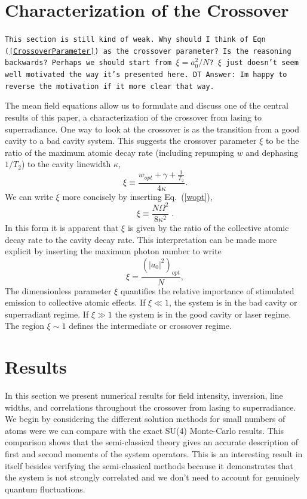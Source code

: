\documentclass[aps,
twocolumn,
showpacs,
superscriptaddress,groupedaddress]{revtex4}
\newcommand{\dmcomment}[1]{{\tt #1}}
\begin{document}
\section{Characterization of the Crossover}
\label{sec:CrossoverCharacterization}

\dmcomment{This section is still kind of weak.  Why should I think of
Eqn (\ref{CrossoverParameter}) as the crossover parameter?  Is the
reasoning backwards?  Perhaps we should start from $\xi=a_0^2/N$?  $\xi$
just doesn't seem well motivated the way it's presented here. DT Answer: Im happy to reverse the motivation if it more clear that way.}

The mean field equations allow us to formulate and discuss one of the
central results of this paper, a characterization of the crossover from
lasing to superradiance.  One way to look at the crossover is as the
transition from a good cavity to a bad cavity system.  This suggests the
crossover parameter $\xi$ to be the ratio of the maximum atomic decay
rate (including repumping $w$ and dephasing $1/T_2$) to the cavity
linewidth $\kappa$,
\begin{equation}
\xi\equiv\frac{ w_{opt}+\gamma+\frac{1}{T_2}}{4\kappa}.
\label{CrossoverParameter}
\end{equation}
We can write $\xi$ more concisely by inserting Eq.~(\ref{wopt}),
\begin{equation}
\xi\equiv \frac{N \Omega^2}{8\kappa^2}\;.
\label{CrossoverParameter2}
\end{equation}
In this form it is apparent that $\xi$ is given by the ratio of the
collective atomic decay rate to the cavity decay rate.  This
interpretation can be made more explicit by inserting the maximum photon
number to write
\begin{equation}
\xi = \frac{(|a_0|^2)_{opt}}{N},
\end{equation}
The dimensionless parameter $\xi$ quantifies the relative importance of
stimulated emission to collective atomic effects. If $\xi\ll1$, the
system is in the bad cavity or superradiant regime. If $\xi\gg1$ the
system is in the good cavity or laser regime. The region $\xi\sim1$
defines the intermediate or crossover regime.


\section{Results}
\label{sec:Results}

In this section we present numerical results for field intensity,
inversion, line widths, and correlations throughout the crossover from
lasing to superradiance.  We begin by considering the different solution
methods for small numbers of atoms were we can compare with the exact
SU(4) Monte-Carlo results.  This comparison shows that the semi-classical
theory gives an accurate description of first and second moments of the
system operators.  This is an interesting result in itself besides
verifying the semi-classical methods because it demonstrates that the
system is not strongly correlated and we don't need to account for
genuinely quantum fluctuations.
\end{document}
